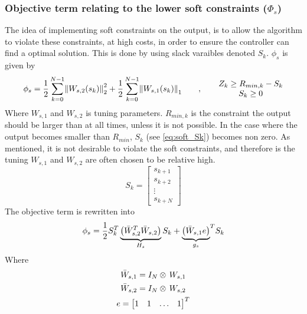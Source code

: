 \subsubsection*{Objective term relating to the lower soft constraints ($\Phi_s$)}
The idea of implementing soft constraints on the output, is to allow the algorithm to violate these constraints, at high costs, in order to ensure the controller can find a optimal solution. This is done by using slack varaibles denoted $S_k$. $\phi_s$ is given by
\begin{equation}
       \phi_s=\frac{1}{2}\, \overset{N-1}{\underset{k=0}{\sum}}\norm{W_{s,2}(s_k)}_2^2+\frac{1}{2}\, \overset{N-1}{\underset{k=0}{\sum}}\norm{W_{s,1}(s_k)}_1 \qquad , \qquad
       \begin{matrix}
       Z_k\geq R_{min,k}-S_k \\ S_k\geq 0
       \end{matrix}
\end{equation}
Where $W_{s,1}$ and $W_{s,2}$ is tuning parameters. $R_{min,k}$ is the constraint the output should be larger than at all times, unless it is not possible. In the case where the output becomes smaller than $R_{min}$, $S_k$ (see \cref{eq:soft_Sk}) becomes non zero. As mentioned, it is not desirable to violate the soft constraints, and therefore is the tuning $W_{s,1}$ and $W_{s,2}$ are often chosen to be relative high. 
\begin{equation}
    S_k=\begin{bmatrix} s_{k+1}\\ s_{k+2}\\ \vdots\\ s_{k+N} \end{bmatrix}
    \label{eq:soft_Sk}
\end{equation}
The objective term is rewritten into
\begin{equation}
     \phi_s=\frac{1}{2}S_k^T\underbrace{\left(\Bar{W}_{s,2}^T\Bar{W}_{s,2}\right)}_{H_s}S_k+{\underbrace{\left(\Bar{W}_{s,1} e\right)}_{g_s}}^TS_k
\end{equation}
Where 
\begin{equation}
    \begin{gathered}
        \Bar{W}_{s,1}=I_N\otimes\,W_{s,1}\\
        \Bar{W}_{s,2}=I_N\otimes\,W_{s,2}\\
        e=\begin{bmatrix}1 & 1 & \dots & 1\end{bmatrix}^T
    \end{gathered}
\end{equation}
